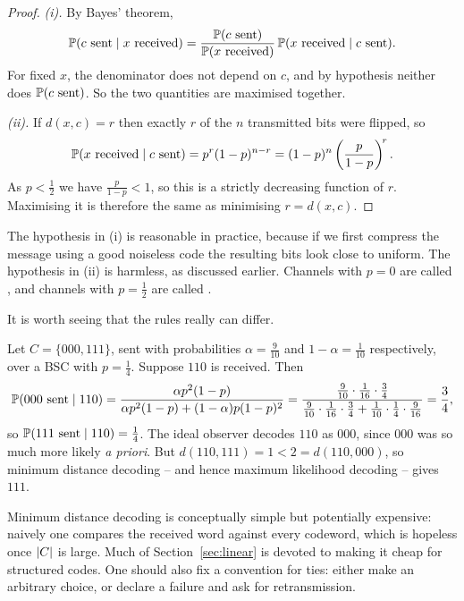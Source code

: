 \documentclass[a4paper]{scrartcl}
\begin{document}
\begin{proof}
	\emph{(i).} By Bayes' theorem,
	$$\mathbb{P}(c \text{ sent} \mid x \text{ received}) = \frac{\mathbb{P}(c \text{ sent})}{\mathbb{P}(x \text{ received})}\,\mathbb{P}(x \text{ received}\mid c \text{ sent}).$$
	For fixed $x$, the denominator does not depend on $c$, and by hypothesis neither does $\mathbb{P}(c \text{ sent})$. So the two quantities are maximised together.

	\emph{(ii).} If $d(x,c) = r$ then exactly $r$ of the $n$ transmitted bits were flipped, so
	$$\mathbb{P}(x \text{ received} \mid c \text{ sent}) = p^r(1-p)^{n-r} = (1-p)^n\left(\frac{p}{1-p}\right)^{\!r}.$$
	As $p < \tfrac12$ we have $\frac{p}{1-p} < 1$, so this is a strictly decreasing function of $r$. Maximising it is therefore the same as minimising $r = d(x,c)$.
\end{proof}

The hypothesis in (i) is reasonable in practice, because if we first compress the message using a good noiseless code the resulting bits look close to uniform. The hypothesis in (ii) is harmless, as discussed earlier. Channels with $p = 0$ are called , and channels with $p = \tfrac12$ are called .

It is worth seeing that the rules really can differ.

\begin{example}
	Let $C = \{000, 111\}$, sent with probabilities $\alpha = \tfrac9{10}$ and $1-\alpha = \tfrac1{10}$ respectively, over a BSC with $p = \tfrac14$. Suppose $110$ is received. Then
	$$\mathbb{P}(000 \text{ sent} \mid 110) = \frac{\alpha p^2(1-p)}{\alpha p^2 (1-p) + (1-\alpha)p(1-p)^2} = \frac{\tfrac9{10}\cdot \tfrac1{16}\cdot\tfrac34}{\tfrac9{10}\cdot\tfrac1{16}\cdot\tfrac34 + \tfrac1{10}\cdot\tfrac14\cdot\tfrac9{16}} = \frac34,$$
	so $\mathbb{P}(111 \text{ sent} \mid 110) = \tfrac14$. The ideal observer decodes $110$ as $000$, since $000$ was so much more likely \emph{a priori}. But $d(110,111) = 1 < 2 = d(110,000)$, so minimum distance decoding -- and hence maximum likelihood decoding -- gives $111$.
\end{example}

\begin{remark}
	Minimum distance decoding is conceptually simple but potentially expensive: naively one compares the received word against every codeword, which is hopeless once $\lvert C\rvert$ is large. Much of Section~\ref{sec:linear} is devoted to making it cheap for structured codes. One should also fix a convention for ties: either make an arbitrary choice, or declare a failure and ask for retransmission.
\end{remark}
\end{document}
